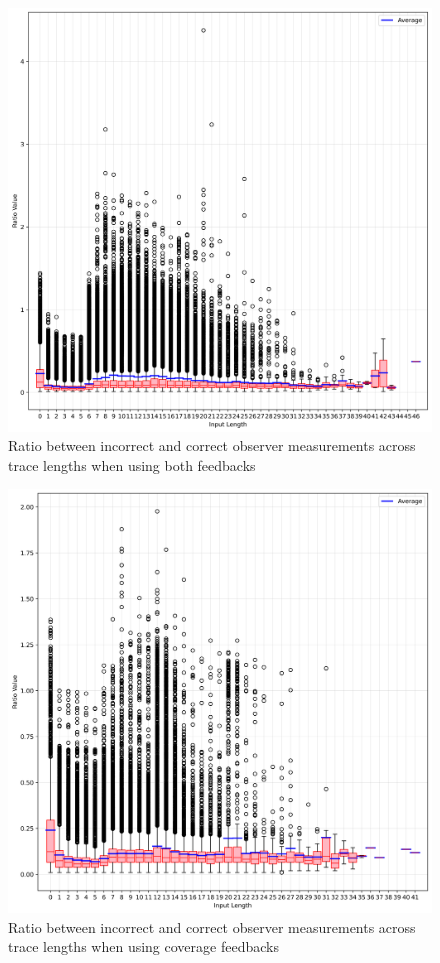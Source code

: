 \documentclass[twocolumn]{article}
\begin{document}
\begin{figure}[htbp]
  \includegraphics[width=\columnwidth]{assets/consistency/both-boxplot.png}
  \caption{Ratio between incorrect and correct observer measurements across trace lengths when using both feedbacks}
  \label{fig:both-inter-boxplot}
\end{figure}
\begin{figure}[htbp]
  \includegraphics[width=\columnwidth]{assets/consistency/coverage-boxplot.png}
  \caption{Ratio between incorrect and correct observer measurements across trace lengths when using coverage feedbacks}
  \label{fig:cov-inter-boxplot}
\end{figure}
\end{document}
